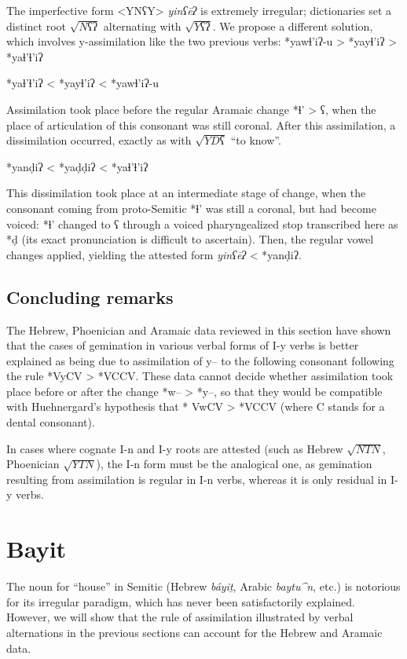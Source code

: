 \documentclass[oldfontcommands,oneside,a4paper,11pt]{article}
\newcommand{\racine}[1]{\begin{math}\sqrt{#1}\end{math}}
\newcommand{\forme}[1]{\textit{#1}}
\begin{document}
\begin{sloppypar}
	The imperfective form <YNʕY> \forme{yinʕēʔ} is extremely irregular; dictionaries set a distinct root \racine{Nʕʔ} alternating with \racine{Yʕʔ}. We propose a different solution, which involves y-assimilation like the two previous verbs: *yawɬ'iʔ-u > *yayɬ'iʔ > *yaɬ'ɬ'iʔ
\begin{exe}
\ex \label{bourgeonner1}	*yaɬ'ɬ'iʔ < *yayɬ'iʔ < *yawɬ'iʔ-u
\end{exe}

Assimilation took place before the regular Aramaic change *ɬ' > ʕ, when the place of articulation of this consonant was still coronal. After this assimilation, a dissimilation occurred, exactly as with \racine{YDʕ} ``to know''.
\begin{exe}
\ex \label{bourgeonner2}	*yanḍiʔ < *yaḍḍiʔ <  *yaɬ'ɬ'iʔ 
\end{exe}
 This dissimilation took place at an intermediate stage of change, when the consonant coming from proto-Semitic *ɬ' was still a coronal, but had become voiced: *ɬ' changed to ʕ through a voiced pharyngealized stop transcribed here as *ḍ (its exact pronunciation is difficult to ascertain). Then, the regular vowel changes applied, yielding the attested form \forme{yinʕēʔ} < *yanḍiʔ.


\subsection{Concluding remarks}

The Hebrew, Phoenician and Aramaic data reviewed in this section have shown that the cases of gemination in various verbal forms of I-y verbs is better explained as being due to  assimilation of y-- to the following consonant following the rule *VyCV > *VCCV. These data cannot decide whether assimilation took place before or after the change *w-- > *y--, so that they  would be compatible with Huehnergard's hypothesis that * VwCV > *VCCV (where C stands for a dental consonant).


In cases where cognate I-n and I-y roots are attested (such as Hebrew \racine{NTN}, Phoenician \racine{YTN}), the I-n form must be the analogical one, as gemination resulting from assimilation is regular in I-n verbs, whereas it is only residual in I-y verbs. 



\section{Bayit} \label{bayit}
The noun for ``house'' in Semitic (Hebrew \forme{báyiṯ}, Arabic \forme{baytu^n}, etc.) is notorious for its irregular paradigm, which has never been satisfactorily explained. However, we will show that the rule of assimilation illustrated by  verbal alternations in the previous sections can account for the Hebrew and Aramaic  data.


\end{sloppypar}
\end{document}
